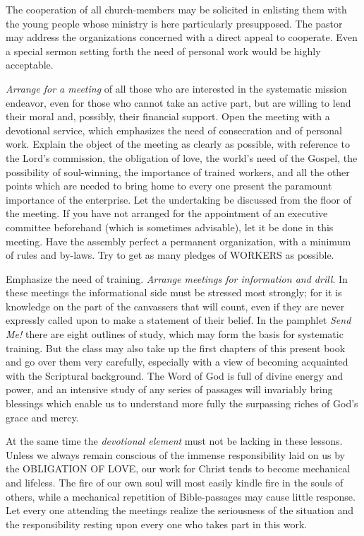 \documentclass[
]{book}
\begin{document}
The cooperation of all church-members may be solicited in enlisting them with the young people whose ministry is here particularly presupposed. The pastor may address the organizations concerned with a direct appeal to cooperate. Even a special sermon setting forth the need of personal work would be highly acceptable.

\emph{Arrange for a meeting} of all those who are interested in the systematic mission endeavor, even for those who cannot take an active part, but are willing to lend their moral and, possibly, their financial support. Open the meeting with a devotional service, which emphasizes the need of consecration and of personal work. Explain the object of the meeting as clearly as possible, with reference to the Lord's commission, the obligation of love, the world's need of the Gospel, the possibility of soul-winning, the importance of trained workers, and all the other points which are needed to bring home to every one present the paramount importance of the enterprise. Let the undertaking be discussed from the floor of the meeting. If you have not arranged for the appointment of an executive committee beforehand (which is sometimes advisable), let it be done in this meeting. Have the assembly perfect a permanent organization, with a minimum of rules and by-laws. Try to get as many pledges of WORKERS as possible.

Emphasize the need of training. \emph{Arrange meetings for information and drill}. In these meetings the informational side must be stressed most strongly; for it is knowledge on the part of the canvassers that will count, even if they are never expressly called upon to make a statement of their belief. In the pamphlet \emph{Send Me!} there are eight outlines of study, which may form the basis for systematic training. But the class may also take up the first chapters of this present book and go over them very carefully, especially with a view of becoming acquainted with the Scriptural background. The Word of God is full of divine energy and power, and an intensive study of any series of passages will invariably bring blessings which enable us to understand more fully the surpassing riches of God's grace and mercy.

At the same time the \emph{devotional element} must not be lacking in these lessons. Unless we always remain conscious of the immense responsibility laid on us by the OBLIGATION OF LOVE, our work for Christ tends to become mechanical and lifeless. The fire of our own soul will most easily kindle fire in the souls of others, while a mechanical repetition of Bible-passages may cause little response. Let every one attending the meetings realize the seriousness of the situation and the responsibility resting upon every one who takes part in this work.
\end{document}
